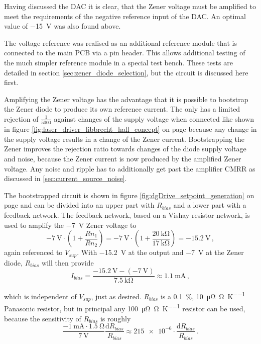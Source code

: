 Having discussed the DAC it is clear, that the Zener voltage must be amplified to meet the requirements of the negative reference input of the DAC. An optimal value of \qty{-15}{\V} was also found above.

The voltage reference was realised as an additional reference module that is connected to the main PCB via a pin header. This allows additional testing of the much simpler reference module in a special test bench. These tests are detailed in section \ref{sec:zener_diode_selection}, but the circuit is discussed here first.

Amplifying the Zener voltage has the advantage that it is possible to bootstrap the Zener diode to produce its own reference current. The  only has a limited rejection of $\frac{1}{5000}$ against changes of the supply voltage when connected like shown in figure \ref{fig:laser_driver_libbrecht_hall_concept} on page \pageref{fig:laser_driver_libbrecht_hall_concept} because any change in the supply voltage results in a change of the Zener current. Bootstrapping the Zener improves the rejection ratio towards changes of the diode supply voltage and noise, because the Zener current is now produced by the amplified Zener voltage. Any noise and ripple has to additionally get past the amplifier CMRR as discussed in \ref{sec:current_source_noise}.

The bootstrapped circuit is shown in figure \ref{fig:dgDrive_setpoint_generation} on page \pageref{fig:dgDrive_setpoint_generation} and can be divided into an upper part with $R_{bias}$ and a lower part with a feedback network. The feedback network, based on a Vishay  \cite{datasheet_300144Z} resistor network, is used to amplify the \qty{-7}{\V} Zener voltage to
\begin{equation*}
    \qty{-7}{\V} \cdot \left(1 + \frac{Rn_1}{Rn_2}\right) = \qty{-7}{\V} \cdot \left(1 + \frac{\qty{20}{\kilo\ohm}}{\qty{17}{\kilo\ohm}}\right) = \qty{-15.2}{\V}\,,
\end{equation*}
again referenced to $V_{sup}$. With \qty{-15.2}{\V} at the output and \qty{-7}{\V} at the Zener diode, $R_{bias}$ will then provide
\begin{equation*}
    I_{bias} = \frac{\qty{-15.2}{\V} - (\qty{-7}{\V})}{\qty{7.5}{\kilo\ohm}} \approx \qty{1.1}{\mA} \,,
\end{equation*}

which is independent of $V_{sup}$, just as desired. $R_{bias}$ is a \qty{0.1}{\percent}, \qty{10}{\micro\ohm \per \ohm \per \K} Panasonic  resistor, but in principal any \qty{100}{\micro\ohm \per \ohm \per \K} resistor can be used, because the sensitivity of $R_{bias}$ is roughly
\begin{equation}
    \frac{\qty{-1}{\mA} \cdot \qty{1.5}{\ohm}}{\qty{7}{\V}} \frac{\mathrm{d} R_{bias}}{R_{bias}} \approx \num{215e-6} \cdot \frac{\mathrm{d} R_{bias}}{R_{bias}}\,.
\end{equation}

